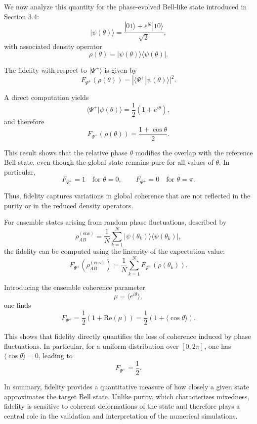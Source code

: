 \documentclass[a4paper]{article}
\begin{document}
We now analyze this quantity for the phase-evolved Bell-like state introduced in Section 3.4:
\[
|\psi(\theta)\rangle = \frac{|01\rangle + e^{i\theta}|10\rangle}{\sqrt{2}},
\]
with associated density operator
\[
\rho(\theta) = |\psi(\theta)\rangle\langle\psi(\theta)|.
\]

The fidelity with respect to $|\Psi^+\rangle$ is given by
\[
F_{\Psi^+}(\rho(\theta))
=
|\langle \Psi^+ | \psi(\theta) \rangle|^2.
\]

A direct computation yields
\[
\langle \Psi^+ | \psi(\theta) \rangle
=
\frac{1}{2}(1 + e^{i\theta}),
\]
and therefore
\[
F_{\Psi^+}(\rho(\theta))
=
\frac{1 + \cos\theta}{2}.
\]

\medskip

This result shows that the relative phase $\theta$ modifies the overlap with the reference Bell state, even though the global state remains pure for all values of $\theta$. In particular,
\[
F_{\Psi^+} = 1 \quad \text{for } \theta = 0,
\qquad
F_{\Psi^+} = 0 \quad \text{for } \theta = \pi.
\]

Thus, fidelity captures variations in global coherence that are not reflected in the purity or in the reduced density operators.

\medskip
For ensemble states arising from random phase fluctuations, described by
\[
\rho_{AB}^{(\mathrm{ens})}
=
\frac{1}{N}\sum_{k=1}^{N}
|\psi(\theta_k)\rangle\langle\psi(\theta_k)|,
\]
the fidelity can be computed using the linearity of the expectation value:
\[
F_{\Psi^+}(\rho_{AB}^{(\mathrm{ens})})
=
\frac{1}{N}
\sum_{k=1}^{N}
F_{\Psi^+}(\rho(\theta_k)).
\]

Introducing the ensemble coherence parameter
\[
\mu = \langle e^{i\theta} \rangle,
\]
one finds
\[
F_{\Psi^+}
=
\frac{1}{2}\left(1 + \mathrm{Re}(\mu)\right)
=
\frac{1}{2}\left(1 + \langle \cos\theta \rangle\right).
\]

\medskip

This shows that fidelity directly quantifies the loss of coherence induced by phase fluctuations. In particular, for a uniform distribution over $[0,2\pi]$, one has $\langle \cos\theta \rangle = 0$, leading to
\[
F_{\Psi^+} = \frac{1}{2}.
\]

\medskip

In summary, fidelity provides a quantitative measure of how closely a given state approximates the target Bell state. Unlike purity, which characterizes mixedness, fidelity is sensitive to coherent deformations of the state and therefore plays a central role in the validation and interpretation of the numerical simulations.
\end{document}
